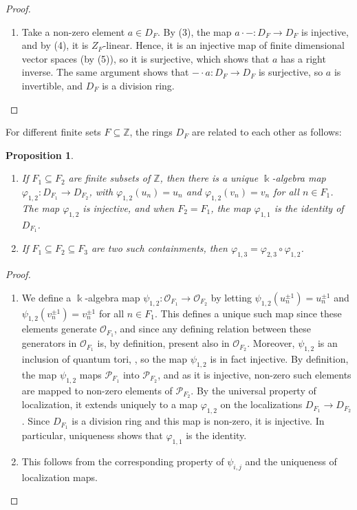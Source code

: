 \documentclass{amsart}
\newtheorem{prop}[equation]{Proposition}
\theoremstyle{definition}
\renewcommand{\k}{\Bbbk}
\numberwithin{equation}{section}
\begin{document}
\begin{proof}
\begin{enumerate}
and $S \subseteq B$ is a multiplicatively closed set,
then $S^{-1}M$ is a finitely generated $S^{-1}B$-module.
\item Take a non-zero element $a \in D_F$.
By (3), the map $a\cdot -:D_F \to D_F$ is injective,
and by (4), it is $Z_F$-linear.
Hence, it is an injective map of finite dimensional vector spaces (by (5)),
so it is surjective, which shows that $a$ has a right inverse.
The same argument shows that $-\cdot a:D_F \to D_F$ is surjective,
so $a$ is invertible, and $D_F$ is a division ring.
\end{enumerate}    
\end{proof}

For different finite sets $F \subseteq \mathbb{Z}$,
the rings $D_F$ are related to each other as follows:

\begin{prop}\label{prop:dirLimitconst}
\quad
\begin{enumerate}
\item If $F_1 \subseteq F_2$ are finite subsets of $\mathbb{Z}$,
then there is a unique $\k$-algebra map $\varphi_{1,2}:D_{F_1} \to D_{F_2}$, with $\varphi_{1,2}(u_n) = u_n$ and $\varphi_{1,2}(v_n) = v_n$ for all $n \in F_1$. 
The map $\varphi_{1,2}$ is injective,
and when $F_2 = F_1$, the map $\varphi_{1,1}$ is the identity of $D_{F_1}$.
\item If $F_1 \subseteq F_2 \subseteq F_3$ are two such containments, then $\varphi_{1,3} = \varphi_{2,3}\circ \varphi_{1,2}$.
\end{enumerate}
\end{prop}
\begin{proof}
\quad
\begin{enumerate}
\item We define a $\k$-algebra map $\psi_{1,2}:\mathcal{O}_{F_1} \to \mathcal{O}_{F_2}$ by letting $\psi_{1,2}(u_n^{\pm 1}) = u_n^{\pm 1}$ and $\psi_{1,2}(v_n^{\pm 1}) = v_n^{\pm 1}$ for all $n \in F_1$. 
This defines a unique such map since these elements generate $\mathcal{O}_{F_1}$, 
and since any defining relation between these generators in $\mathcal{O}_{F_1}$ is, by definition, present also in $\mathcal{O}_{F_2}$.
Moreover, $\psi_{1,2}$ is an inclusion of quantum tori,
\cite[1.5.9 and Example 1.5.10(ii)]{NCBook}, so the map $\psi_{1,2}$ is in fact injective.
By definition, the map $\psi_{1,2}$ maps $\mathcal{P}_{F_1}$ into $\mathcal{P}_{F_2}$, and as it is injective,
non-zero such elements are mapped to non-zero elements of $\mathcal{P}_{F_2}$.
By the universal property of localization, it extends uniquely to a map $\varphi_{1,2}$ on the localizations $D_{F_1} \to D_{F_2}$. Since $D_{F_1}$ is a division ring and this map is non-zero, it is injective.
In particular, uniqueness shows that $\varphi_{1,1}$ is the identity.
\item This follows from the corresponding property of $\psi_{i,j}$ and the uniqueness of localization maps.
\end{enumerate}
\end{proof}
\end{document}
